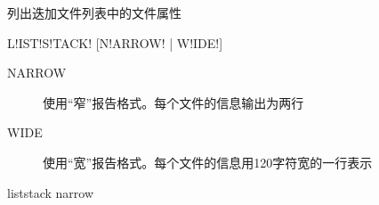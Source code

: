 \label{sss:liststack}

列出迭加文件列表中的文件属性

\begin{SACSTX}
L!IST!S!TACK! [N!ARROW! | W!IDE!]
\end{SACSTX}

\begin{description}
\item [NARROW] 使用``窄''报告格式。每个文件的信息输出为两行
\item [WIDE] 使用``宽''报告格式。每个文件的信息用120字符宽的一行表示
\end{description}

\begin{SACDFT}
liststack narrow
\end{SACDFT}
